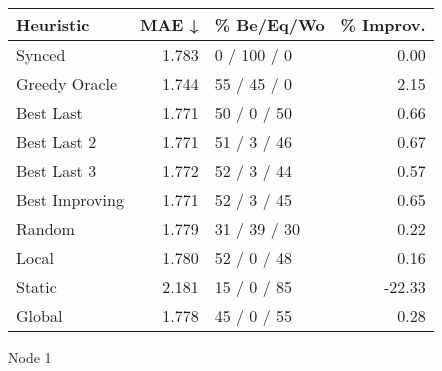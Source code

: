 \begin{tabular}{lrlr}
\toprule
\textbf{Heuristic} & \textbf{MAE ↓} & \textbf{\% Be/Eq/Wo} & \textbf{\% Improv.} \\
\midrule
            Synced &          1.783 &          0 / 100 / 0 &                0.00 \\
     Greedy Oracle &          1.744 &          55 / 45 / 0 &                2.15 \\
         Best Last &          1.771 &          50 / 0 / 50 &                0.66 \\
       Best Last 2 &          1.771 &          51 / 3 / 46 &                0.67 \\
       Best Last 3 &          1.772 &          52 / 3 / 44 &                0.57 \\
    Best Improving &          1.771 &          52 / 3 / 45 &                0.65 \\
            Random &          1.779 &         31 / 39 / 30 &                0.22 \\
             Local &          1.780 &          52 / 0 / 48 &                0.16 \\
            Static &          2.181 &          15 / 0 / 85 &              -22.33 \\
            Global &          1.778 &          45 / 0 / 55 &                0.28 \\
\bottomrule
\end{tabular}
\caption{Node 1}
\label{tab:ds_iid_lr01_le2_bs2_1}
